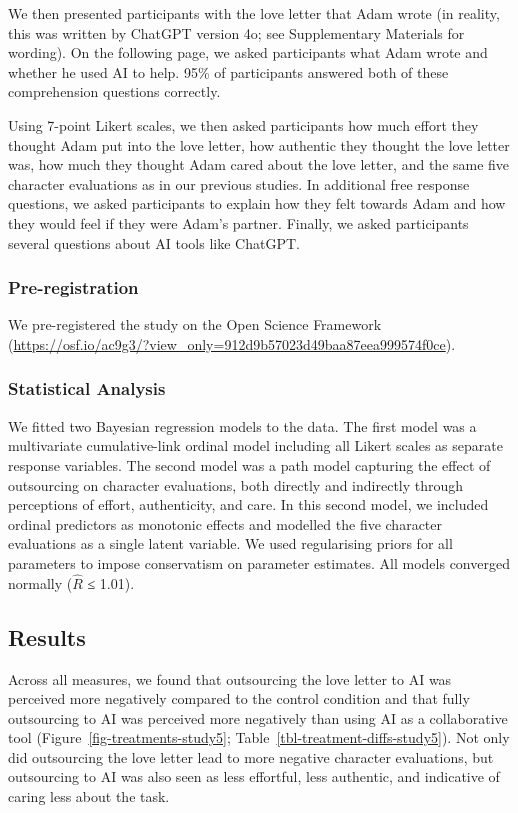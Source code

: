 \documentclass[
  man,
  floatsintext,
  longtable,
  nolmodern,
  notxfonts,
  notimes,
  colorlinks=true,linkcolor=blue,citecolor=blue,urlcolor=blue]{apa7}
\begin{document}
We then presented participants with the love letter that Adam wrote (in
reality, this was written by ChatGPT version 4o; see Supplementary
Materials for wording). On the following page, we asked participants
what Adam wrote and whether he used AI to help. 95\% of participants
answered both of these comprehension questions correctly.

Using 7-point Likert scales, we then asked participants how much effort
they thought Adam put into the love letter, how authentic they thought
the love letter was, how much they thought Adam cared about the love
letter, and the same five character evaluations as in our previous
studies. In additional free response questions, we asked participants to
explain how they felt towards Adam and how they would feel if they were
Adam's partner. Finally, we asked participants several questions about
AI tools like ChatGPT.

\subsubsection*{Pre-registration}\label{pre-registration-4}

We pre-registered the study on the Open Science Framework
(\url{https://osf.io/ac9g3/?view_only=912d9b57023d49baa87eea999574f0ce}).

\subsubsection*{Statistical Analysis}\label{statistical-analysis-4}

We fitted two Bayesian regression models to the data. The first model
was a multivariate cumulative-link ordinal model including all Likert
scales as separate response variables. The second model was a path model
capturing the effect of outsourcing on character evaluations, both
directly and indirectly through perceptions of effort, authenticity, and
care. In this second model, we included ordinal predictors as monotonic
effects and modelled the five character evaluations as a single latent
variable. We used regularising priors for all parameters to impose
conservatism on parameter estimates. All models converged normally
(\(\hat{R}\) ≤ 1.01).

\subsection*{Results}\label{results-4}

Across all measures, we found that outsourcing the love letter to AI was
perceived more negatively compared to the control condition and that
fully outsourcing to AI was perceived more negatively than using AI as a
collaborative tool (Figure~\ref{fig-treatments-study5};
Table~\ref{tbl-treatment-diffs-study5}). Not only did outsourcing the
love letter lead to more negative character evaluations, but outsourcing
to AI was also seen as less effortful, less authentic, and indicative of
caring less about the task.
\end{document}
